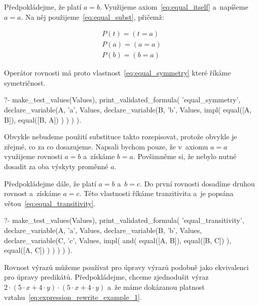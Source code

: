 Předpokládejme, že platí \(a = b\). Využijeme axiom~\eqref{eq:equal_itself} a~napíšeme \(a = a\). Na něj použijeme~\eqref{eq:equal_subst}, přičemž:

\begin{equation}
\begin{split}
P(t) = (t = a) \\
P(a) = (a = a) \\
P(b) = (b = a)
\end{split}
\end{equation}

Operátor rovnosti má proto vlastnost~\eqref{eq:equal_symmetry} které říkáme symetričnost.

\begin{fact}
\begin{prolog}
?- 	make_test_values(Values),
	print_validated_formula(
		'equal_symmetry',
		declare_variable(A, 'a', Values,
			declare_variable(B, 'b', Values,
				impl(
					equal([A, B]),
					equal([B, A])
				)
			)
		)
	).
\end{prolog}
\end{fact}

Obvykle nebudeme použití substituce takto rozepisovat, protože obvykle je zřejmé, co za co dosazujeme. Napsali bychom pouze, že v~axiomu \(a = a\) využijeme rovnosti \(a = b\) a~získáme \(b = a\). Povšimněme si, že nebylo nutné dosadit za oba výskyty proměnné \(a\).

Předpokládejme dále, že platí \(a = b\) a~\(b = c\). Do první rovnosti dosadíme druhou rovnost a~získáme \(a = c\). Této vlastnosti říkáme tranzitivita a~je popsána větou~\eqref{eq:equal_transitivity}.

\begin{fact}
\begin{prolog}
?- 	make_test_values(Values),
	print_validated_formula(
		'equal_transitivity',
		declare_variable(A, 'a', Values,
			declare_variable(B, 'b', Values,
				declare_variable(C, 'c', Values,
					impl(
						and(
							equal([A, B]),
							equal([B, C])
						),
						equal([A, C])
					)
				)
			)
		)
	).
\end{prolog}
\end{fact}

Rovnost výrazů můžeme používat pro úpravy výrazů podobně jako ekvivalenci pro úpravy predikátů. Předpokládejme, chceme zjednodušit výraz \(2 \cdot (5 \cdot x + 4 \cdot y) \cdot (5 \cdot x + 4 \cdot y)\) a~že máme dokázanou platnost vztahu~\eqref{eq:expression_rewrite_example_1}.

